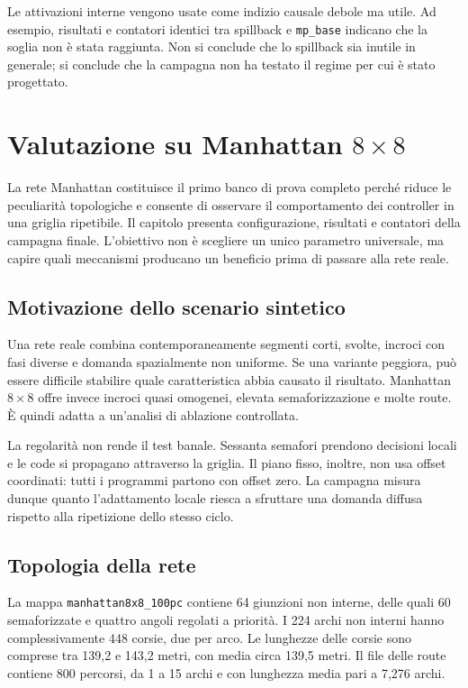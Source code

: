\documentclass[12pt,a4paper,oneside]{report}
\numberwithin{equation}{chapter}
\begin{document}
Le attivazioni interne vengono usate come indizio causale debole ma utile. Ad
esempio, risultati e contatori identici tra spillback e \texttt{mp\_base} indicano che la
soglia non è stata raggiunta. Non si conclude che lo spillback sia inutile in
generale; si conclude che la campagna non ha testato il regime per cui è stato
progettato.

\chapter{Valutazione su Manhattan \texorpdfstring{$8\times8$}{8x8}}
\label{chap:manhattan}

La rete Manhattan costituisce il primo banco di prova completo perché riduce
le peculiarità topologiche e consente di osservare il comportamento dei
controller in una griglia ripetibile. Il capitolo presenta configurazione,
risultati e contatori della campagna finale. L'obiettivo non è scegliere un unico
parametro universale, ma capire quali meccanismi producano un beneficio prima
di passare alla rete reale.

\section{Motivazione dello scenario sintetico}

Una rete reale combina contemporaneamente segmenti corti, svolte, incroci con
fasi diverse e domanda spazialmente non uniforme. Se una variante peggiora,
può essere difficile stabilire quale caratteristica abbia causato il risultato.
Manhattan $8\times8$ offre invece incroci quasi omogenei, elevata
semaforizzazione e molte route. È quindi adatta a un'analisi di ablazione
controllata.

La regolarità non rende il test banale. Sessanta semafori prendono decisioni
locali e le code si propagano attraverso la griglia. Il piano fisso, inoltre,
non usa offset coordinati: tutti i programmi partono con offset zero. La
campagna misura dunque quanto l'adattamento locale riesca a sfruttare una
domanda diffusa rispetto alla ripetizione dello stesso ciclo.

\section{Topologia della rete}

La mappa \texttt{manhattan8x8\_100pc} contiene 64 giunzioni non interne, delle
quali 60 semaforizzate e quattro angoli regolati a priorità. I 224 archi non
interni hanno complessivamente 448 corsie, due per arco. Le lunghezze delle
corsie sono comprese tra 139,2 e 143,2 metri, con media circa 139,5 metri. Il
file delle route contiene 800 percorsi, da 1 a 15 archi e con lunghezza media
pari a 7,276 archi.
\end{document}
